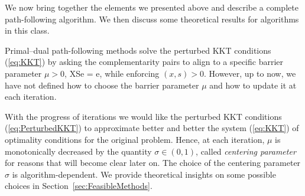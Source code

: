 We now bring together the elements we presented above and describe
a complete path-following algorithm. We then discuss some
theoretical results for algorithms in this class.

Primal--dual path-following methods solve the perturbed KKT
conditions (\ref{eq:KKT}) by asking the complementarity pairs to align 
to a specific barrier parameter $\mu > 0$,
\be  \label{eq:PerturbedComplementarity}
XSe = \mu e,
\ee
while enforcing $(x,s)>0$.
However, up to now, we have not defined how to choose the
barrier parameter $\mu$ and how to update it at each iteration.


With the progress of iterations 
we would like the perturbed KKT conditions (\ref{eq:PerturbedKKT}) 
to approximate better and better
the system (\ref{eq:KKT}) of optimality conditions for the original
problem.
Hence, at each iteration, $\mu$ is monotonically decreased by the quantity
$\sigma \in (0,1)$, called {\em centering parameter} for reasons that
will become clear later on.
The choice of the centering parameter $\sigma$ 
is algorithm-dependent. We provide theoretical insights on some
possible choices in Section~\ref{sec:FeasibleMethods}.


